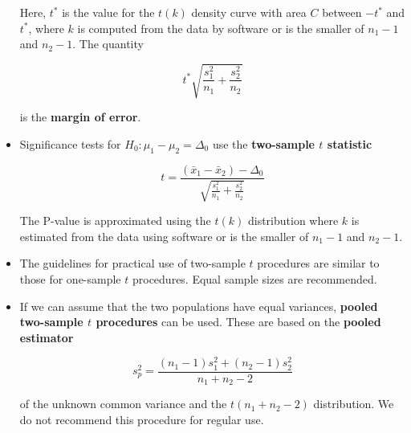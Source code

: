 \begin{itemize}
			Here, $t^{*}$ is the value for the $t(k)$ density curve with area $C$ between $-t^{*}$ and $t^{*}$, where $k$ is computed from the data by software or is the smaller of $n_1-1$ and $n_2-1$. The quantity
			
			\[t^{*}\sqrt{ \frac{s_1^2}{n_1}+\frac{s_2^2}{n_2} } \]
			
			is the \textbf{margin of error}.
			
			\item Significance tests for $H_0:\mu_1 -\mu_2=\Delta_0$ use the \textbf{two-sample $t$ statistic}
			
			\[t=\frac{(\bar{x}_1-\bar{x}_2)-\Delta_0}{\sqrt{ \frac{s_1^2}{n_1}+\frac{s_2^2}{n_2}}}\]
			
			The P-value is approximated using the $t(k)$ distribution where $k$ is estimated from the data using software or is the smaller of $n_1-1$ and $n_2-1$.
			
			\item The guidelines for practical use of two-sample $t$ procedures are similar to those for one-sample $t$ procedures. Equal sample sizes are recommended.
			
			\item If we can assume that the two populations have equal variances, \textbf{pooled two-sample $t$ procedures} can be used. These are based on the \textbf{pooled estimator}
			
			\[s^2_p=\frac{(n_1-1)s_1^2 + (n_2-1)s_2^2}{n_1+n_2-2}\]
			
			of the unknown common variance and the $t(n_1+n_2-2)$ distribution. We do not recommend this procedure for regular use.
		\end{itemize}
